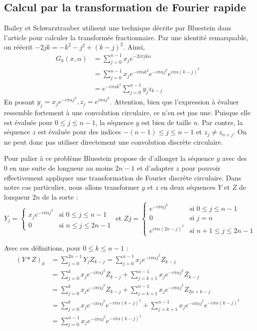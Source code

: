 \documentclass{article}
\begin{document}
\subsection{Calcul par la transformation de Fourier rapide}\label{secBlue}
Bailey et Schwarztrauber utilisent une technique décrite par Bluestein dans l'article \cite{BLUE} pour calculer la transformée fractionnaire. Par une identité remarquable, on réécrit $-2jk = - k^2 -j^2 + (k-j)^2 $. Ainsi,
\begin{align*}
  G_k(x, \alpha)
  &= \sum_{j=0}^{n-1}x_je^{-2i\pi jk\alpha} \\
  &= \sum_{j=0}^{n-1}x_je^{-i\pi\alpha k^2}e^{-i\pi\alpha j^2} e^{i\pi\alpha (k-j)^2} \\
  &= e^{-i\pi \alpha k^2 } \sum_{j=0}^{n-1}y_jz_{k-j} 
\end{align*}
En posant $ y_j = x_je^{-i\pi \alpha j^2 }, z_j = e^{i\pi \alpha j^2 }$.
Attention, bien que l'expression à évaluer ressemble fortement à une convolution circulaire, ce n'en est pas une. Puisque elle est évaluée pour $0 \le j \le n-1$, la séquence $y$ est bien de taille $n$. Par contre, la séquence $z$ est évaluée pour des indices $-(n-1) \le j \le n-1$ et $z_{j} \neq z_{n+j}$. On ne peut donc pas utiliser directement une convolution discrète circulaire.

Pour palier à ce problème Bluestein propose de d'allonger la séquence $y$ avec des $0$ en une suite de longueur au moins $2n-1$ et d'adapter $z$ pour pouvoir effectivement appliquer une transformation de Fourier discrète circulaire. 
Dans notre cas particulier, nous allons transformer $y$ et $z$ en deux séquences $Y$ et $Z$ de lonqueur $2n$ de la sorte :
\begin{equation}
Y_j = 
\begin{cases}
  x_je^{-i\pi \alpha j^2}  &\text{si } 0 \le j \le n-1\\
  0                        &\text{si } n \le j \le 2n-1
\end{cases}
\text{ et }
Zj =
\begin{cases}
  e^{-i\pi \alpha j^2}        & \text{si }0 \le j \le n-1\\
  0                           & \text{si }j = n\\
  e^{i\pi \alpha (2n-j)^2}    & \text{si }n+1 \le j \le 2n-1
\end{cases}
\label{YZ}
\end{equation}


Avec ces définitions, pour $0 \le k \le n-1$ :
\begin{align*}
  (Y*Z)_k 
  &= \sum_{j=0}^{2n-1}Y_jZ_{k-j}
  = \sum_{j=0}^{n-1}x_je^{-i\pi \alpha j^2} Z_{k-j}\\
  &= \sum_{j=0}^{k}x_je^{-i\pi \alpha j^2} Z_{k-j} + \sum_{j=k+1}^{n-1}x_je^{-i\pi \alpha j^2} Z_{k-j}\\
  &= \sum_{j=0}^{k}x_je^{-i\pi \alpha j^2} Z_{k-j}  + \sum_{j=k+1}^{n-1}x_je^{-i\pi \alpha j^2} Z_{2n + k-j}\\
  &= \sum_{j=0}^{k}x_je^{-i\pi \alpha j^2} e^{-i\pi \alpha (k-j)^2}  + \sum_{j=k+1}^{n-1}x_je^{-i\pi \alpha j^2}e^{-i\pi \alpha (k-j)^2} \\
  &= \sum_{j=0}^{n-1}x_je^{-i\pi \alpha j^2} e^{-i\pi \alpha (k-j)^2}  
\end{align*}
\end{document}
